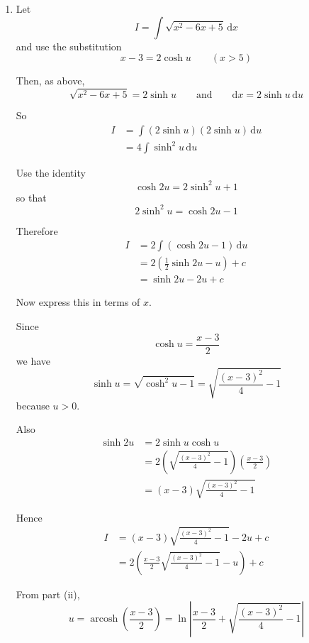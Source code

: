 \documentclass[leqno]{article}
\begin{document}
\begin{enumerate}[
  label=\textbf{\arabic*.},
  leftmargin=*,
  topsep=0pt,
  partopsep=0pt,
  parsep=0pt
]
\begin{tcolorbox}[colback=white, colframe=scarlet, title={\textbf{Solution}}, breakable, grow to left by=6mm, grow to right by=10mm]
\begin{enumerate}[label=\textbf{(\roman*)}, start=1]
  Using the standard result
  \[
  \operatorname{arcosh} z=\ln\left(z+\sqrt{z^2-1}\right)
  \]
  we get
  \[
  \int \frac{1}{\sqrt{x^2-6x+5}}\,\mathrm{d}x
  =\ln\left(\frac{x-3}{2}+\sqrt{\frac{(x-3)^2}{4}-1}\right)+c
  \]

  So the answer is
  \[
  \operatorname{arcosh}\left(\frac{x-3}{2}\right)+c
  \]
  and hence
  \[
  \ln\left(\frac{x-3}{2}+\sqrt{\frac{(x-3)^2}{4}-1}\right)+c
  \]

  \item Let
  \[
  I=\int \sqrt{x^2-6x+5}\,\mathrm{d}x
  \]
  and use the substitution
  \[
  x-3=2\cosh u \qquad (x>5)
  \]

  Then, as above,
  \[
  \sqrt{x^2-6x+5}=2\sinh u
  \qquad\text{and}\qquad
  \mathrm{d}x=2\sinh u\,\mathrm{d}u
  \]

  So
  \begin{align*}
  I
  &=\int (2\sinh u)(2\sinh u)\,\mathrm{d}u \\
  &=4\int \sinh^2u\,\mathrm{d}u
  \end{align*}

  Use the identity
  \[
  \cosh 2u=2\sinh^2u+1
  \]
  so that
  \[
  2\sinh^2u=\cosh 2u-1
  \]

  Therefore
  \begin{align*}
  I
  &=2\int (\cosh 2u-1)\,\mathrm{d}u \\
  &=2\left(\frac{1}{2}\sinh 2u-u\right)+c \\
  &=\sinh 2u-2u+c
  \end{align*}

  Now express this in terms of $x$.

  Since
  \[
  \cosh u=\frac{x-3}{2}
  \]
  we have
  \[
  \sinh u=\sqrt{\cosh^2u-1}
  =\sqrt{\frac{(x-3)^2}{4}-1}
  \]
  because $u>0$.

  Also
  \begin{align*}
  \sinh 2u
  &=2\sinh u\cosh u \\
  &=2\left(\sqrt{\frac{(x-3)^2}{4}-1}\right)\left(\frac{x-3}{2}\right) \\
  &=(x-3)\sqrt{\frac{(x-3)^2}{4}-1}
  \end{align*}

  Hence
  \begin{align*}
  I
  &=(x-3)\sqrt{\frac{(x-3)^2}{4}-1}-2u+c \\
  &=2\left(\frac{x-3}{2}\sqrt{\frac{(x-3)^2}{4}-1}-u\right)+c
  \end{align*}

  From part (ii),
  \[
  u=\operatorname{arcosh}\left(\frac{x-3}{2}\right)
  =\ln\left|\frac{x-3}{2}+\sqrt{\frac{(x-3)^2}{4}-1}\right|
  \]


\end{enumerate}
\end{tcolorbox}
\end{enumerate}
\end{document}
